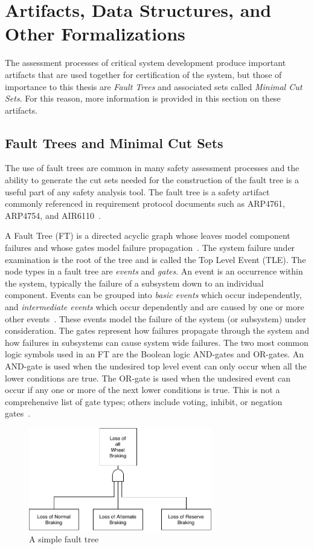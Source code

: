 \section{Artifacts, Data Structures, and Other Formalizations}
\label{chap:artifacts}
The assessment processes of critical system development produce important artifacts that are used together for certification of the system, but those of importance to this thesis are \textit{Fault Trees} and associated sets called \textit{Minimal Cut Sets}. For this reason, more information is provided in this section on these artifacts.

\subsection{Fault Trees and Minimal Cut Sets}
The use of fault trees are common in many safety assessment processes and the ability to generate the cut sets needed for the construction of the fault tree is a useful part of any safety analysis tool. The fault tree is a safety artifact commonly referenced in requirement protocol documents such as ARP4761, ARP4754, and AIR6110~\cite{SAE:ARP4761,SAE:ARP4754A,AIR6110}.

A Fault Tree (FT) is a directed acyclic graph whose leaves model component failures and whose gates model failure propagation~\cite{0f356f05e72f43018211b36f97c8854a}. The system failure under examination is the root of the tree and is called the Top Level Event (TLE). The node types in a fault tree are \textit{events} and \textit{gates}. An event is an occurrence within the system, typically the failure of a subsystem down to an individual component. Events can be grouped into \textit{basic events} which occur independently, and \textit{intermediate events} which occur dependently and are caused by one or more other events~\cite{historyFTA}.  These events model the failure of the system (or subsystem) under consideration. The gates represent how failures propagate through the system and how failures in subsystems can cause system wide failures. The two most common logic symbols used in an FT are the Boolean logic AND-gates and OR-gates. An AND-gate is used when the undesired top level event can only occur when all the lower conditions are true. The OR-gate is used when the undesired event can occur if any one or more of the next lower conditions is true. This is not a comprehensive list of gate types; others include voting, inhibit, or negation gates~\cite{0f356f05e72f43018211b36f97c8854a}.
\begin{figure}[h]
\begin{center}
\includegraphics[width=8cm]{images/introFT2.pdf}
\caption{A simple fault tree} \label{fig:introFT}
\end{center}
\end{figure}

